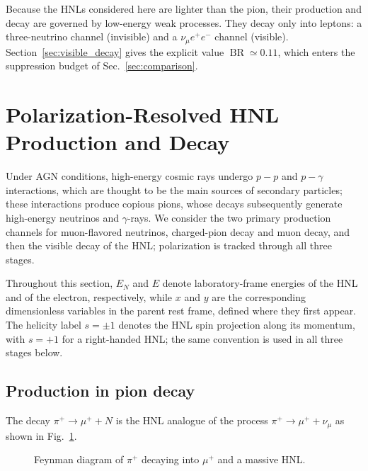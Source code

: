 \documentclass{ws-ijmpa}
\begin{document}
Because the HNLs considered here are lighter than the pion, their production
and decay are governed by low-energy weak processes. They decay only into
leptons: a three-neutrino channel (invisible) and a $\nu_\mu e^+e^-$ channel
(visible). Section~\ref{sec:visible_decay} gives the explicit value
$\operatorname{BR} \simeq 0.11$, which enters the suppression budget of
Sec.~\ref{sec:comparison}.

\section{Polarization-Resolved HNL Production and Decay}
\label{sec:HNL_production_decay}

Under AGN conditions, high-energy cosmic rays undergo $p-p$ and $p-\gamma$
interactions, which are thought to be the main sources of secondary
particles;\cite{Murase_2023} these interactions produce copious pions, whose
decays subsequently generate high-energy neutrinos and $\gamma$-rays.\cite{kelner2006energy,kelner2008energy}
We consider the two primary production channels for
muon-flavored neutrinos, charged-pion decay and muon decay, and then the
visible decay of the HNL; polarization is tracked through all three stages.

Throughout this section, $E_N$ and $E$ denote laboratory-frame energies of
the HNL and of the electron, respectively, while $x$ and $y$ are the
corresponding dimensionless variables in the parent rest frame, defined
where they first appear. The helicity label $s=\pm1$ denotes the HNL spin
projection along its momentum, with $s=+1$ for a right-handed HNL; the same
convention is used in all three stages below.

\subsection{Production in pion decay}\label{sec:pion_decay}

The decay $\pi^+ \to \mu^+ + N$ is the HNL analogue of the
process $\pi^+ \to \mu^+ + \nu_\mu$ as shown in Fig.~\ref{fig:feynman_pi}.\cite{PhysRevD.24.1232}
\begin{figure}[htbp]
  \centering
  \caption{Feynman diagram of $\pi^+$ decaying into $\mu^+$ and a massive HNL.}
  \label{fig:feynman_pi}
\end{figure}
\end{document}
